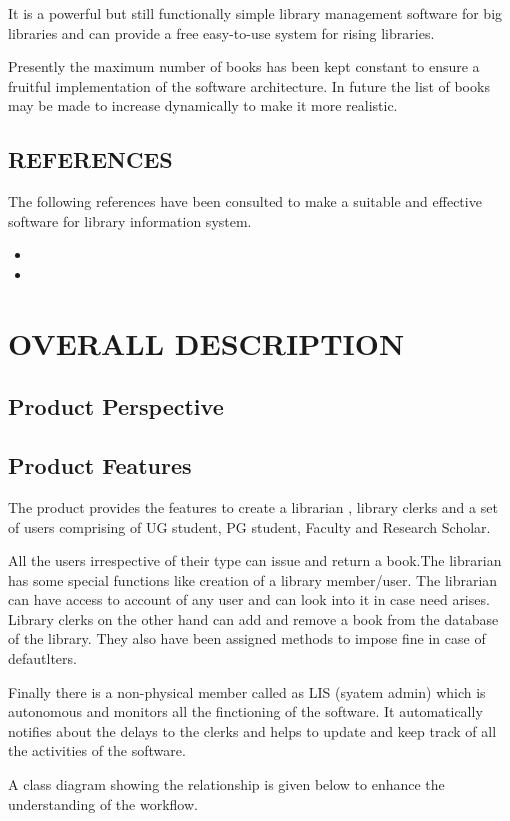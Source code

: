 \documentclass{article}
\begin{document}
It is a powerful but still functionally simple library management software for big libraries and can provide a free easy-to-use system for rising libraries.

Presently the maximum number of books has been kept constant to ensure a fruitful implementation of the software architecture. In future the list of books may be made to increase dynamically to make it more realistic.
\subsection{REFERENCES}
The following references have been consulted to make a suitable and effective software for library information system.

\begin{itemize}
\item 
\item 
\end{itemize}


\section{OVERALL DESCRIPTION}
\subsection{Product Perspective}

\subsection{Product Features}
The product provides the features to create a librarian , library clerks and a set of users comprising of UG student, PG student, Faculty and Research Scholar.

All the users irrespective of their type can issue and return a book.The librarian has some special functions like creation of a library member/user. The librarian can have access to account of any user and can look into it in case need arises.
Library clerks on the other hand can add and remove a book from the database of the library. They also have been assigned methods to impose fine in case of defautlters.

Finally there is a non-physical member called as LIS (syatem admin) which is autonomous and monitors all the finctioning of the software. It automatically notifies about the delays to the clerks and helps to update and keep track of all the activities of the software.

A class diagram showing the relationship is given below to enhance the understanding of the workflow.
\end{document}
